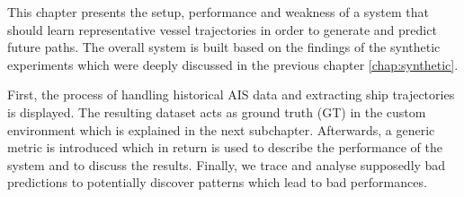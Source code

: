 This chapter presents the setup, performance and weakness of a system that should learn representative vessel trajectories in order to generate and predict future paths. The overall system is built based on the findings of the synthetic experiments which were deeply discussed in the previous chapter \ref{chap:synthetic}.
\par
First, the process of handling historical AIS data and extracting ship trajectories is displayed. The resulting dataset acts as ground truth (GT) in the custom environment which is explained in the next subchapter. Afterwards, a generic metric is introduced which in return is used to describe the performance of the system and to discuss the results. Finally, we trace and analyse supposedly bad predictions to potentially discover patterns which lead to bad performances.